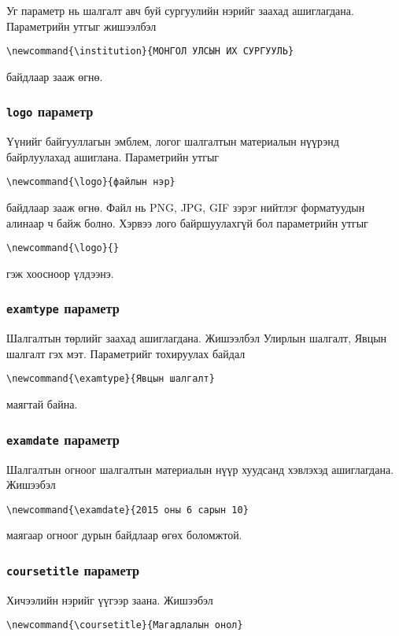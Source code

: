\documentclass[10pt]{article}
\theoremstyle{definition}
\begin{document}
Уг параметр нь шалгалт авч буй сургуулийн нэрийг заахад ашиглагдана. Параметрийн утгыг жишээлбэл 
\begin{verbatim}
\newcommand{\institution}{МОНГОЛ УЛСЫН ИХ СУРГУУЛЬ}
\end{verbatim}
байдлаар зааж өгнө.

\subsubsection{\texttt{logo} параметр}

Үүнийг байгууллагын эмблем, логог шалгалтын материалын нүүрэнд  байрлуулахад ашиглана. Параметрийн утгыг 
\begin{verbatim}
\newcommand{\logo}{файлын нэр}
\end{verbatim}
байдлаар зааж өгнө. Файл нь PNG, JPG, GIF зэрэг нийтлэг форматуудын алинаар ч байж болно. Хэрвээ лого байршуулахгүй бол параметрийн утгыг 
\begin{verbatim}
\newcommand{\logo}{}
\end{verbatim}
гэж хоосноор үлдээнэ.

\subsubsection{\texttt{examtype} параметр}

Шалгалтын төрлийг заахад ашиглагдана. Жишээлбэл Улирлын шалгалт, Явцын шалгалт гэх мэт. Параметрийг тохируулах байдал 
\begin{verbatim}
\newcommand{\examtype}{Явцын шалгалт}
\end{verbatim}
маягтай байна.

\subsubsection{\texttt{examdate} параметр}

Шалгалтын огноог шалгалтын материалын нүүр хуудсанд хэвлэхэд ашиглагдана. Жишээбэл 
\begin{verbatim}
\newcommand{\examdate}{2015 оны 6 сарын 10}
\end{verbatim}
маягаар огноог дурын байдлаар өгөх боломжтой.

\subsubsection{\texttt{coursetitle} параметр}

Хичээлийн нэрийг үүгээр заана. Жишээбэл 
\begin{verbatim}
\newcommand{\coursetitle}{Магадлалын онол}
\end{verbatim}
\end{document}
